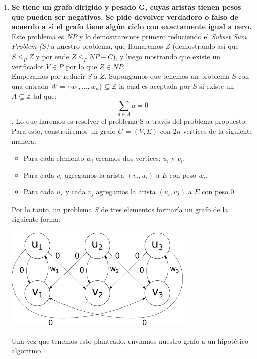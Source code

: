\documentclass{article}
\newcommand{\Z}{\mathbb{Z}}
\newcommand\tab[1][0.5cm]{\hspace*{#1}}
\begin{document}
\begin{enumerate}
        \item \textbf{Se tiene un grafo dirigido y pesado G, cuyas aristas tienen pesos que pueden ser negativos. Se pide
            devolver verdadero o falso de acuerdo a si el grafo tiene algún ciclo con exactamente igual a cero.} \\
            \tab Este problema es $NP$ y lo demostraremos primero reduciendo el \emph{Subset Sum Problem (S)} a nuestro
            problema, que llamaremos $Z$ (demostrando así que $S \leq_{P} Z$ y por ende $Z \leq_{P} NP-C$), y luego mostrando
            que existe un verificador $V \in P$ por lo que $Z \in NP$. \\
            \tab Empezamos por reducir $S$ a $Z$.
            \tab Supongamos que tenemos un problema $S$ con una entrada $W = \{w_{1}, ..., w_{n}\} \subseteq \Z$
                la cual es aceptada por $S$ si existe un $A\subseteq \Z$ tal que: $$\sum_{a \in A} a = 0$$.
                \tab Lo que haremos es resolver el problema S a través del problema propuesto. Para esto,
                construiremos un grafo $G = (V, E)$ con $2n$ vertices de la siguiente manera:
                \begin{itemize}
                    \item Para cada elemento $w_{i}$ creamos dos vertices: $u_{i}$ y $v_{i}$.
                    \item Para cada $v_{i}$ agregamos la arista $(v_{i}, u_{i})$ a $E$ con peso $w_{i}$.
                    \item Para cada $u_{i}$ y cada $v_{j}$ agregamos la arista $(u_{i}, v{j})$ a $E$ con peso $0$.
                \end{itemize}
            \tab\tab Por lo tanto, un problema $S$ de tres elementos formaría un grafo de la siguiente forma:
                \begin{center}
                    \includegraphics[width=9cm, height=5cm]{images/Problema6}
                \end{center}
            \tab\tab Una vez que tenemos esto planteado, envíamos nuestro grafo a un hipotético algoritmo

\end{enumerate}
\end{document}
